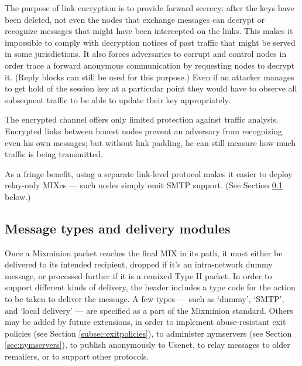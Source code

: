 \documentclass{llncs}
\begin{document}
The purpose of link encryption is to provide forward secrecy: 
after the keys
have been deleted, not even the
nodes that exchange messages can decrypt or recognize messages
that might have been intercepted on the links. This makes it
impossible to comply with decryption notices of past traffic 
that might be served in
some jurisdictions.  
It also forces adversaries to 
corrupt and control nodes in order trace
a forward anonymous communication by requesting nodes to decrypt
it. 
(Reply blocks can still be used for this purpose.)  Even if an
attacker manages to get hold of the session key at a particular point
they would have to observe all subsequent traffic to be able to update
their key appropriately.

The encrypted channel offers only limited protection against traffic
analysis. Encrypted links between honest nodes prevent an adversary
from recognizing even his own messages; but without link padding, he
can still measure how much traffic is being transmitted.

As a fringe benefit, using a separate link-level protocol makes it
easier to deploy relay-only MIXes --- such nodes simply omit SMTP
support.  (See Section \ref{subsec:delivery-modules} below.)

\subsection{Message types and delivery modules}
\label{subsec:delivery-modules}

Once a Mixminion packet reaches the final MIX in its path, it must either
be delivered to its intended recipient, dropped if it's an intra-network
dummy message, or processed further if it is a remixed Type II packet.
In order to support different kinds of
delivery, the header includes a type code for the action to be taken
to deliver the message.  A few types --- such as `dummy', `SMTP', and
`local delivery' --- are specified as a part of the Mixminion
standard.  Others may be added by future extensions, in order to
implement abuse-resistant exit policies (see Section
\ref{subsec:exitpolicies}), to administer nymservers (see Section
\ref{sec:nymservers}), to publish anonymously to Usenet, to relay
messages to older remailers, or to support other protocols.
\end{document}
